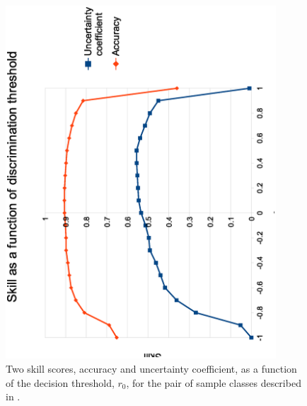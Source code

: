 \documentclass{article}
\begin{document}
\begin{figure}
\includegraphics[width=0.9\textwidth,angle=-90]{skillvsr0.eps}
\caption{Two skill scores, accuracy and uncertainty coefficient, as a function of
the decision threshold, $r_0$,
for the pair of sample classes described in \citet{Mills2011}.}
\label{skillvsr0}
\end{figure}
\end{document}
